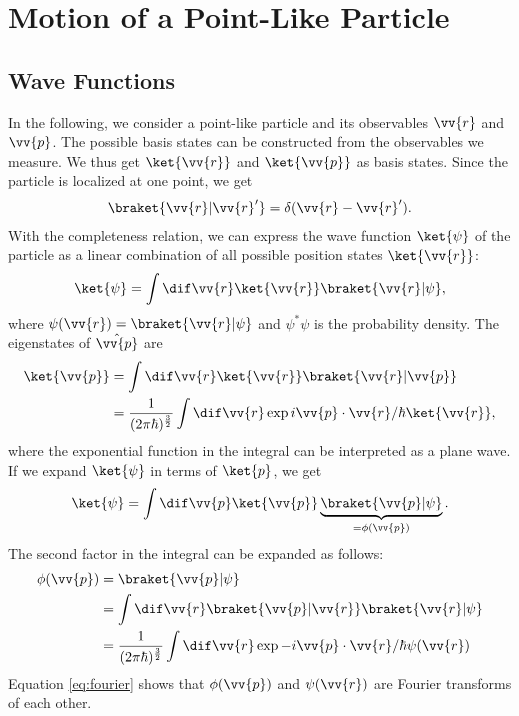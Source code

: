 \section{Motion of a Point-Like Particle}
		\subsection{Wave Functions}
			In the following, we consider a point-like particle and its observables $\vv{r}$ and $\vv{p}$. The possible basis states can be constructed from the observables we measure. We thus get $\ket{\vv{r}}$ and $\ket{\vv{p}}$ as basis states. Since the particle is localized at one point, we get
			\begin{align}
				\braket{\vv{r}|\vv{r}'} =\delta(\vv{r}-\vv{r}').
			\end{align}
			With the completeness relation, we can express the wave function $\ket{\psi}$ of the particle as a linear combination of all possible position states $\ket{\vv{r}}$:
			\begin{align}
				\ket{\psi}=\int \dif \vv{r} \ket{\vv{r}}\braket{\vv{r}|\psi},
			\end{align}
			where $\psi(\vv{r})=\braket{\vv{r}|\psi}$ and $\psi^*\psi$ is the probability density.
			The eigenstates of $\hat{\vv{p}}$ are
			\begin{align}
				\ket{\vv{p}}&=\int \dif \vv{r} \ket{\vv{r}} \braket{\vv{r}|\vv{p}} \\
				&= \frac{1}{(2\pi\hbar)^{\frac{3}{2}}} \int \dif \vv{r} \exp{{i \vv{p}\cdot\vv{r}}/{\hbar}}\ket{\vv{r}},
			\end{align}
			where the exponential function in the integral can be interpreted as a plane wave.
			If we expand $\ket{\psi}$ in terms of $\ket{p}$, we get
			\begin{align}
				\ket{\psi}=\int \dif \vv{p} \ket{\vv{p}}\underbrace{\braket{\vv{p}|\psi}}_{=\phi(\vv{p})}.
			\end{align}
			The second factor in the integral can be expanded as follows:
			\begin{align}
				\phi(\vv{p})	&=\braket{\vv{p}|\psi}\\
				&=\int\dif\vv{r}\braket{\vv{p}|\vv{r}}\braket{\vv{r}|\psi}\\
				&=\frac{1}{(2\pi\hbar)^{\frac{3}{2}}} \int\dif\vv{r}\exp{-i\vv{p}\cdot\vv{r}/{\hbar}}\psi(\vv{r}) \label{eq:fourier}
			\end{align}
			Equation \eqref{eq:fourier} shows that $\phi(\vv{p})$ and $\psi(\vv{r})$ are Fourier transforms of each other.

